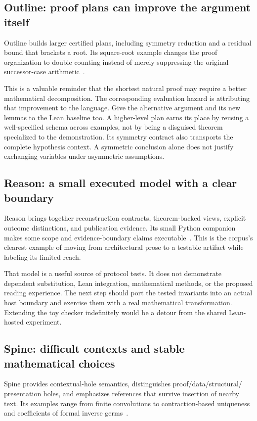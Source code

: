 \documentclass[11pt,letterpaper]{article}
\begin{document}
\subsection{Outline: proof plans can improve the argument itself}
Outline builds larger certified plans, including symmetry reduction and a residual
bound that brackets a root. Its square-root example changes the proof organization
to double counting instead of merely suppressing the original successor-case
arithmetic~\cite[\S\S6,7,9]{outline}.

This is a valuable reminder that the shortest natural proof may require a better
mathematical decomposition. The corresponding evaluation hazard is attributing
that improvement to the language. Give the alternative argument and its new lemmas
to the Lean baseline too. A higher-level plan earns its place by reusing a
well-specified schema across examples, not by being a disguised theorem specialized
to the demonstration.
Its symmetry contract also transports the complete hypothesis context. A symmetric
conclusion alone does not justify exchanging variables under asymmetric assumptions.

\subsection{Reason: a small executed model with a clear boundary}
Reason brings together reconstruction contracts, theorem-backed views, explicit
outcome distinctions, and publication evidence. Its small Python companion makes
some scope and evidence-boundary claims executable~\cite[\S\S10,12,18]{reason}.
This is the corpus's clearest example of moving from architectural prose to a
testable artifact while labeling its limited reach.

That model is a useful source of protocol tests. It does not demonstrate dependent
substitution, Lean integration, mathematical methods, or the proposed reading
experience. The next step should port the tested invariants into an actual host
boundary and exercise them with a real mathematical transformation. Extending the
toy checker indefinitely would be a detour from the shared Lean-hosted experiment.

\subsection{Spine: difficult contexts and stable mathematical choices}
Spine provides contextual-hole semantics, distinguishes proof/data/structural/
presentation holes, and emphasizes references that survive insertion of nearby
text. Its examples range from finite convolutions to contraction-based uniqueness
and coefficients of formal inverse germs~\cite[\S\S4--9]{spine}.
\end{document}

